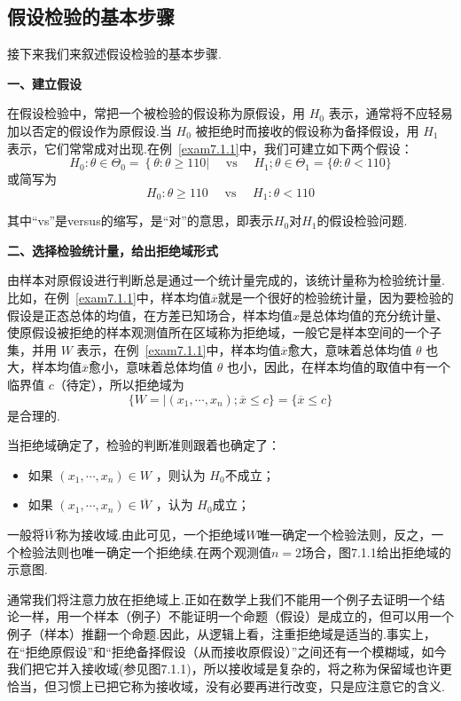 \subsection{假设检验的基本步骤\label{7.1.2}}
接下来我们来叙述假设检验的基本步骤.

\textbf{一、建立假设}

在假设检验中，常把一个被检验的假设称为原假设，用 $H_{0}$ 表示，通常将不应轻易加以否定的假设作为原假设.当 $H_{0}$ 被拒绝时而接收的假设称为备择假设，用 $H_{1}$ 表示，它们常常成对出现.在例~\ref{exam7.1.1}中，我们可建立如下两个假设：
\[H _ { 0 } : \theta \in \Theta _ { 0 } = \left\{ \theta : \theta \geq 110 | \quad \text { vs } \quad H _ { 1 } ; \theta \in \Theta _ { 1 } = \{ \theta : \theta < 110 \}\right.\]
或简写为
\[H _ { 0 } : \theta \geq 110 \quad \text { vs } \quad H _ { 1 } : \theta < 110\]

其中“vs”是versus的缩写，是“对”的意思，即表示$H_{0}$对$H_{1}$的假设检验问题.

\textbf{二、选择检验统计量，给出拒绝域形式}

由样本对原假设进行判断总是通过一个统计量完成的，该统计量称为检验统计量.比如，在例~\ref{exam7.1.1}中，样本均值$\overline{x}$就是一个很好的检验统计量，因为要检验的假设是正态总体的均值，在方差已知场合，样本均值$x$是总体均值的充分统计量、使原假设被拒绝的样本观测值所在区域称为拒绝域，一般它是样本空间的一个子集，并用 $W$ 表示，在例~\ref{exam7.1.1}中，样本均值$\overline{x}$愈大，意味着总体均值 $\theta$ 也大，样本均值$\overline{x}$愈小，意味着总体均值 $\theta$ 也小，因此，在样本均值的取值中有一个临界值 $c$（待定），所以拒绝域为
\[\{W = | \left( x _ { 1 } , \cdots , x _ { n } \right) ; \overline { x } \leq c \} = \{ \overline { x } \leq c \}\]
是合理的.

当拒绝域确定了，检验的判断准则跟着也确定了：
\begin{itemize}
	\item 如果 $\left( x _ { 1 } , \cdots , x _ { n } \right) \in W$ ，则认为 $H_{0}$不成立；
	\item 如果 $\left( x _ { 1 } , \cdots , x _ { n } \right) \in \overline { W }$ ，认为 $H_{0}$成立；
\end{itemize}

一般将$\overline{W}$称为接收域.由此可见，一个拒绝域$W$唯一确定一个检验法则，反之，一个检验法则也唯一确定一个拒绝续.在两个观测值$n=2$场合，图7.1.1给出拒绝域的示意图.
	
通常我们将注意力放在拒绝域上.正如在数学上我们不能用一个例子去证明一个结论一样，用一个样本（例子）不能证明一个命题（假设）是成立的，但可以用一个例子（样本）推翻一个命题.因此，从逻辑上看，注重拒绝域是适当的.事实上，在“拒绝原假设”和“拒绝备择假设（从而接收原假设）”之间还有一个模糊域，如今我们把它并入接收域(参见图7.1.1)，所以接收域是复杂的，将之称为保留域也许更恰当，但习惯上已把它称为接收域，没有必要再进行改变，只是应注意它的含义.

